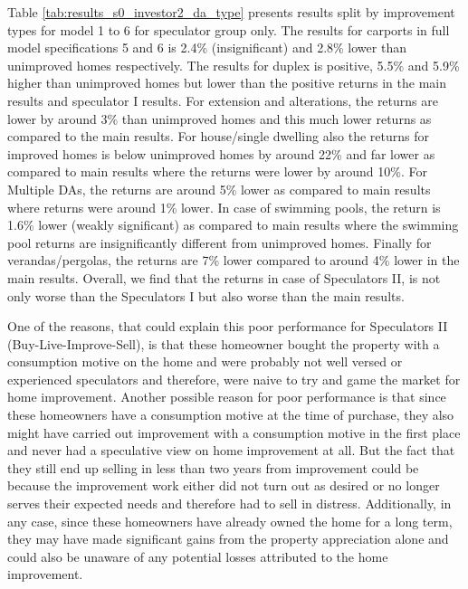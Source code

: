 \documentclass[AEJ,reqno, draftmode]{AEA} %
\begin{document}
Table \ref{tab:results_s0_investor2_da_type} presents results split by improvement types for model 1 to 6 for speculator group only. The results for carports in full model specifications 5 and 6 is 2.4\% (insignificant) and 2.8\% lower than unimproved homes respectively. The results for duplex is positive, 5.5\% and 5.9\% higher than unimproved homes but lower than the positive returns in the main results and speculator I results. For extension and alterations, the returns are lower by around 3\% than unimproved homes and this much lower returns as compared to the main results. For house/single dwelling also the returns for improved homes is below unimproved homes by around 22\% and far lower as compared to main results where the returns were lower by around 10\%. For Multiple DAs, the returns are around 5\% lower as compared to main results where returns were around 1\% lower. In case of swimming pools, the return is 1.6\% lower (weakly significant) as compared to main results where the swimming pool returns are insignificantly different from unimproved homes. Finally for verandas/pergolas, the returns are 7\% lower compared to around 4\% lower in the main results. Overall, we find that the returns in case of Speculators II, is not only worse than the Speculators I but also worse than the main results. 

One of the reasons, that could explain this poor performance for Speculators II (Buy-Live-Improve-Sell), is that these homeowner bought the property with a consumption motive on the home and were probably not well versed or experienced speculators and therefore, were naive to try and game the market for home improvement.  Another possible reason for poor performance is that since these homeowners have a consumption motive at the time of purchase, they also might have carried out improvement with a consumption motive in the first place and never had a speculative view on home improvement at all. But the fact that they still end up selling in less than two years from improvement could be because the improvement work either did not turn out as desired or no longer serves their expected needs and therefore had to sell in distress. Additionally, in any case, since these homeowners have already owned the home for a long term, they may have made significant gains from the property appreciation alone and could also be unaware of any potential losses attributed to the home improvement.

\end{document}
